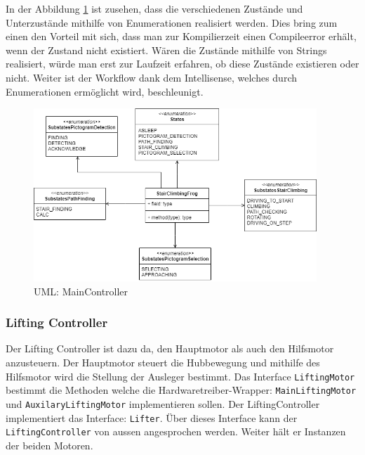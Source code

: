 In der Abbildung \ref{fig:uml-main} ist zusehen, dass die verschiedenen Zustände und Unterzustände mithilfe von Enumerationen realisiert werden. Dies bring zum einen den Vorteil mit sich, dass man zur Kompilierzeit einen Compileerror erhält, wenn der Zustand nicht existiert. Wären die Zustände mithilfe von Strings realisiert, würde man erst zur Laufzeit erfahren, ob diese Zustände existieren oder nicht. Weiter ist der Workflow dank dem Intellisense, welches durch Enumerationen ermöglicht wird, beschleunigt.

\begin{figure}[H]
  \includegraphics[width=0.95\textwidth]{img/softwarearchitektur/UML-MainController.png}
  \centering
  \caption{UML: MainController}
  \label{fig:uml-main}
\end{figure}


\subsubsection{Lifting Controller}
Der Lifting Controller ist dazu da, den Hauptmotor als auch den Hilfsmotor anzusteuern. Der Hauptmotor steuert die Hubbewegung und mithilfe des Hilfsmotor wird die Stellung der Ausleger bestimmt. 
Das Interface \texttt{LiftingMotor} bestimmt die Methoden welche die Hardwaretreiber-Wrapper: \texttt{MainLiftingMotor} und \texttt{AuxilaryLiftingMotor} implementieren sollen. Der LiftingController implementiert das Interface: \texttt{Lifter}. Über dieses Interface kann der \texttt{LiftingController} von aussen angesprochen werden. Weiter hält er Instanzen der beiden Motoren.

